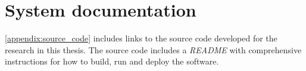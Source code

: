 

















\section{System documentation}
\label{sec:systemDocumentation}




\autoref{appendix:source_code} includes links to the source code developed for the research in this thesis. The source code includes a \textit{README} with comprehensive instructions for how to build, run and deploy the software.




\cleardoublepage